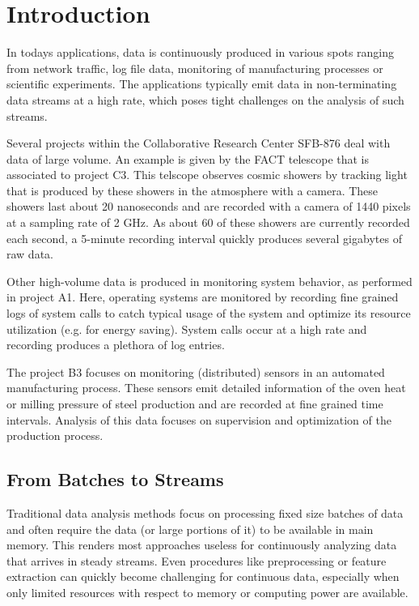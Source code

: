 \section{\label{sec:intro}Introduction}
In todays applications, data is continuously produced in various spots
ranging from network traffic, log file data, monitoring of
manufacturing processes or scientific experiments. The applications
typically emit data in non-terminating data streams at a high rate,
which poses tight challenges on the analysis of such streams.

Several projects within the Collaborative Research Center SFB-876 deal
with data of large volume. An example is given by the FACT telescope
that is associated to project C3. This telscope observes cosmic
showers by tracking light that is produced by these showers in the
atmosphere with a camera.  These showers last about 20 nanoseconds and
are recorded with a camera of 1440 pixels at a sampling rate of 2
GHz. As about 60 of these showers are currently recorded each second,
a 5-minute recording interval quickly produces several gigabytes of
raw data.

Other high-volume data is produced in monitoring system behavior, as
performed in project A1. Here, operating systems are monitored by
recording fine grained logs of system calls to catch typical usage of
the system and optimize its resource utilization (e.g. for energy
saving). System calls occur at a high rate and recording produces a
plethora of log entries.

The project B3 focuses on monitoring (distributed) sensors in an
automated manufacturing process. These sensors emit detailed
information of the oven heat or milling pressure of steel production
and are recorded at fine grained time intervals. Analysis of this data
focuses on supervision and optimization of the production process.

\subsection{From Batches to Streams}
Traditional data analysis methods focus on processing fixed size
batches of data and often require the data (or large portions of it)
to be available in main memory. This renders most approaches useless
for continuously analyzing data that arrives in steady streams. Even
procedures like preprocessing or feature extraction can quickly become
challenging for continuous data, especially when only limited
resources with respect to memory or computing power are available.

